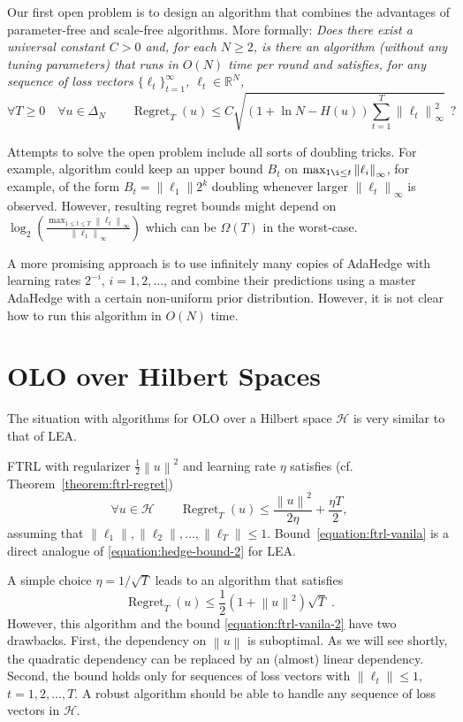 \documentclass{colt2016} %
\DeclareMathOperator{\Regret}{Regret}
\newcommand{\R}{\mathbb{R}}     %
\renewcommand{\H}{\mathcal{H}}  %
\newcommand{\norm}[1]{\left\|{#1}\right\|}
\begin{document}
Our first open problem is to design an algorithm that combines the advantages
of parameter-free and scale-free algorithms. More formally: \emph{Does there
exist a universal constant $C > 0$ and, for each $N \ge 2$, is there an
algorithm (without any tuning parameters) that runs in $O(N)$ time per round
and satisfies, for any sequence of loss
vectors $\{\ell_t\}_{t=1}^\infty$, $\ell_t \in \R^N$,}
\begin{equation}
\forall T \ge 0 \quad \forall u \in \Delta_N \qquad \Regret_T(u) \le C \sqrt{(1 + \ln N - H(u)) \sum_{t=1}^T \norm{\ell_t}_\infty^2} \ \ ?
\end{equation}

Attempts to solve the open problem include all sorts of doubling tricks.
For example, algorithm could keep an upper bound $B_t$ on $\max_{1 \i \le t}
\norm{\ell_i}_\infty$, for example, of the form $B_t = \norm{\ell_1} 2^k$
doubling whenever larger $\norm{\ell_t}_\infty$ is observed. However, resulting
regret bounds might depend on $\log_2 \left( \frac{\max_{1 \le t \le T}
\norm{\ell_t}_\infty}{\norm{\ell_1}_\infty} \right)$ which can be $\Omega(T)$
in the worst-case.

A more promising approach is to use infinitely many copies of AdaHedge with
learning rates $2^{-i}$, $i=1,2,\dots$, and combine their predictions using
a master AdaHedge with a certain non-uniform prior distribution. However, it is not clear how to run this
algorithm in $O(N)$ time.

\section{OLO over Hilbert Spaces}

The situation with algorithms for OLO over a Hilbert space $\H$ is very similar
to that of LEA.

FTRL with regularizer
$\frac{1}{2}\norm{u}^2$ and learning rate $\eta$ satisfies (cf. Theorem~\ref{theorem:ftrl-regret})
\begin{equation}
\label{equation:ftrl-vanila}
\forall u \in \H \qquad \Regret_T(u) \le \frac{\norm{u}^2}{2\eta} + \frac{\eta T}{2},
\end{equation}
assuming that $\norm{\ell_1}, \norm{\ell_2}, \dots, \norm{\ell_T} \le 1$.
Bound~\eqref{equation:ftrl-vanila} is a direct analogue of
\eqref{equation:hedge-bound-2} for LEA.

A simple choice $\eta = 1/\sqrt{T}$ leads to an algorithm that satisfies
\begin{equation}
\label{equation:ftrl-vanila-2}
\Regret_T(u) \le \frac{1}{2}\left(1+\norm{u}^2\right)\sqrt{T} \; .
\end{equation}
However, this algorithm and the bound \eqref{equation:ftrl-vanila-2} have two
drawbacks.  First, the dependency on $\norm{u}$ is suboptimal. As we will see
shortly, the quadratic dependency can be replaced by an (almost) linear
dependency.  Second, the bound holds only for sequences of loss vectors with
$\norm{\ell_t} \le 1$, $t=1,2,\dots,T$. A robust algorithm should be able to
handle any sequence of loss vectors in $\H$.
\end{document}
